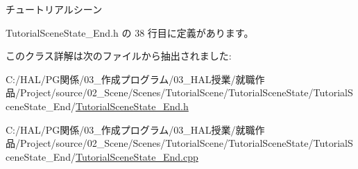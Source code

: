 チュートリアルシーン 



 Tutorial\+Scene\+State\+\_\+\+End.\+h の 38 行目に定義があります。



このクラス詳解は次のファイルから抽出されました\+:\begin{DoxyCompactItemize}
\item 
C\+:/\+H\+A\+L/\+P\+G関係/03\+\_\+作成プログラム/03\+\_\+\+H\+A\+L授業/就職作品/\+Project/source/02\+\_\+\+Scene/\+Scenes/\+Tutorial\+Scene/\+Tutorial\+Scene\+State/\+Tutorial\+Scene\+State\+\_\+\+End/\mbox{\hyperlink{_tutorial_scene_state___end_8h}{Tutorial\+Scene\+State\+\_\+\+End.\+h}}\item 
C\+:/\+H\+A\+L/\+P\+G関係/03\+\_\+作成プログラム/03\+\_\+\+H\+A\+L授業/就職作品/\+Project/source/02\+\_\+\+Scene/\+Scenes/\+Tutorial\+Scene/\+Tutorial\+Scene\+State/\+Tutorial\+Scene\+State\+\_\+\+End/\mbox{\hyperlink{_tutorial_scene_state___end_8cpp}{Tutorial\+Scene\+State\+\_\+\+End.\+cpp}}\end{DoxyCompactItemize}
